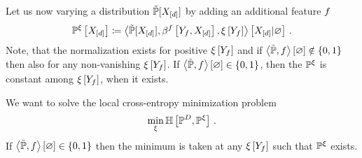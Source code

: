 
Let us now varying a distribution $\tilde{\mathbb{P}}[X_{[d]}]$ by adding an additional feature $f$
\begin{align*}
    \mathbb{P}^{\xi}\left[X_{[d]}\right]
    \coloneqq \left\langle \tilde{\mathbb{P}}[X_{[d]}],\beta^{f}\left[Y_{f},X_{[d]}\right],\xi\left[Y_{f}\right]\right\rangle \left[ X_{[d]} | \varnothing \right] \, .
\end{align*}
Note, that the normalization exists for positive $\xi\left[Y_{f}\right]$ and if $\left\langle \tilde{\mathbb{P}},f\right\rangle \left[ \varnothing \right]\notin\{0,1\}$ then also for any non-vanishing $\xi\left[Y_{f}\right]$.
If $\left\langle \tilde{\mathbb{P}},f\right\rangle \left[ \varnothing \right]\in\{0,1\}$, then the $\mathbb{P}^{\xi}$ is constant among $\xi\left[Y_{f}\right]$, when it exists.

We want to solve the local cross-entropy minimization problem
\begin{align*}
    \min_{\xi} \mathbb{H}\left[\mathbb{P}^{D},\mathbb{P}^{\xi}\right] \,.
\end{align*}
If $\left\langle \tilde{\mathbb{P}},f\right\rangle \left[ \varnothing \right]\in\{0,1\}$ then the minimum is taken at any $\xi\left[Y_{f}\right]$ such that $\mathbb{P}^{\xi}$ exists.

